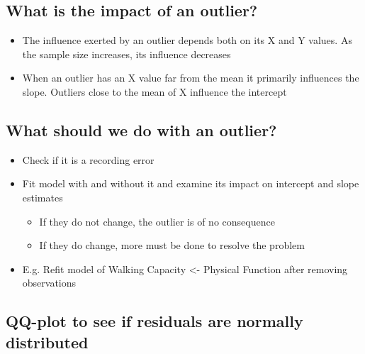 \documentclass[
]{book}
\providecommand{\tightlist}{%
  \setlength{\itemsep}{0pt}\setlength{\parskip}{0pt}}
\begin{document}
\hypertarget{what-is-the-impact-of-an-outlier}{%
\subsection{What is the impact of an outlier?}\label{what-is-the-impact-of-an-outlier}}

\begin{itemize}
\tightlist
\item
  The influence exerted by an outlier depends both on its X and Y values. As the sample size increases, its influence decreases
\item
  When an outlier has an X value far from the mean it primarily influences the slope. Outliers close to the mean of X influence the intercept
\end{itemize}

\hypertarget{what-should-we-do-with-an-outlier}{%
\subsection{What should we do with an outlier?}\label{what-should-we-do-with-an-outlier}}

\begin{itemize}
\tightlist
\item
  Check if it is a recording error
\item
  Fit model with and without it and examine its impact on intercept and slope estimates

  \begin{itemize}
  \tightlist
  \item
    If they do not change, the outlier is of no consequence
  \item
    If they do change, more must be done to resolve the problem
  \end{itemize}
\item
  E.g. Refit model of Walking Capacity \textless- Physical Function after removing observations
\end{itemize}

\hypertarget{qq-plot-to-see-if-residuals-are-normally-distributed}{%
\subsection{QQ-plot to see if residuals are normally distributed}\label{qq-plot-to-see-if-residuals-are-normally-distributed}}
\end{document}
